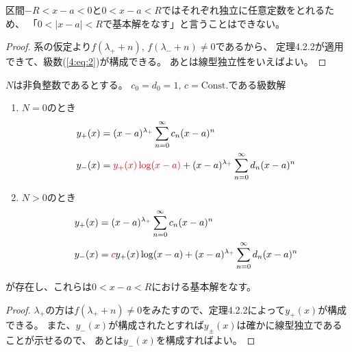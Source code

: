 \documentclass[report]{jlreq}
\begin{document}
区間$-R < x - a < 0$と$0 < x - a < R$ではそれぞれ独立に任意定数をとれるため、
「$0 < |x - a| < R$で基本解をなす」と言うことはできない。

\begin{proof}
    系の仮定より$f(\lambda_+ + n),\, f(\lambda_- + n) \neq 0$であるから、
    定理4.2.2が適用できて、級数(\ref{4:eq:2})が構成できる。
    あとは線型独立性をいえばよい。
\end{proof}

\begin{theorem}[4.2.4 $N$が整数の場合の基本解]
    $N$は非負整数であるとする。
    $c_{0} = d_{0} = 1,\, c = \text{Const.}$である級数解
    \begin{enumerate}
        \item $N = 0$のとき
            \begin{equation}
                \begin{split}
                    y_{+}(x) &= (x - a)^{\lambda_+} \sum_{n = 0}^\infty c_{n} (x - a)^n \\
                    y_{-}(x)
                        &= \textcolor{red}{y_{+}(x) \log(x - a)}
                        + (x - a)^{\lambda_+} \sum_{n = 0}^\infty d_{n} (x - a)^n
                \end{split}
            \end{equation}
        \item $N > 0$のとき
            \begin{equation}
                \begin{split}
                    y_{+}(x) &= (x - a)^{\lambda_+} \sum_{n = 0}^\infty c_{n} (x - a)^n \\
                    y_{-}(x)
                        &= \textcolor{red}{c} y_{+}(x) \log(x - a)
                        + (x - a)^{\lambda_+} \sum_{n = 0}^\infty d_{n} (x - a)^n
                \end{split}
            \end{equation}
    \end{enumerate}
    が存在し、これらは$0 < x - a < R$における基本解をなす。
\end{theorem}

\begin{proof}
    $\lambda_+$の方は$f(\lambda_+ + n) \neq 0$をみたすので、定理4.2.2によって$y_+(x)$が構成できる。
    また、$y_-(x)$が構成されたとすれば$y_\pm(x)$は確かに線型独立であることが示せるので、
    あとは$y_-(x)$を構成すればよい。
\end{proof}
\end{document}
